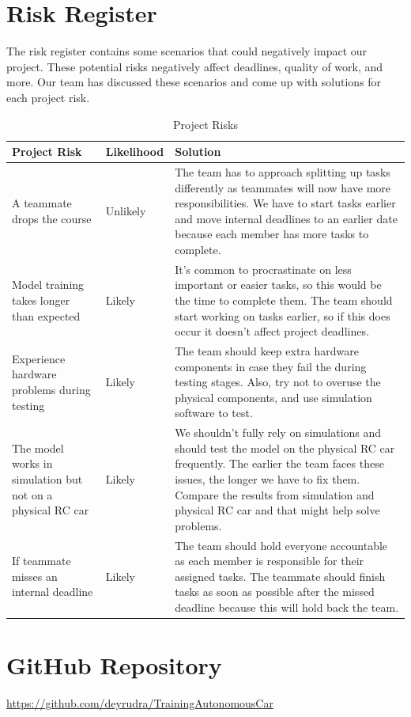 \documentclass{article} %
\begin{document}
\section{Risk Register}
The risk register contains some scenarios that could negatively impact our project. 
These potential risks negatively affect deadlines, quality of work, and more. Our team has 
discussed these scenarios and come up with solutions for each project risk. 

\begin{table}[H]
\caption{Project Risks}
\centering
\begin{tabular}{|p{4cm}|p{2.5cm}|p{7cm}|}
\hline
\textbf{Project Risk} & \textbf{Likelihood} & \textbf{Solution} \\ \hline
A teammate drops the course & Unlikely & The team has to approach splitting up tasks differently as teammates will now have more responsibilities. We have to start tasks earlier and move internal deadlines to an earlier date because each member has more tasks to complete. \\ \hline
Model training takes longer than expected & Likely & It’s common to procrastinate on less important or easier tasks, so this would be the time to complete them. The team should start working on tasks earlier, so if this does occur it doesn’t affect project deadlines. \\ \hline
Experience hardware problems during testing & Likely & The team should keep extra hardware components in case they fail the during testing stages. Also, try not to overuse the physical components, and use simulation software to test. \\ \hline
The model works in simulation but not on a physical RC car & Likely & We shouldn’t fully rely on simulations and should test the model on the physical RC car frequently. The earlier the team faces these issues, the longer we have to fix them. Compare the results from simulation and physical RC car and that might help solve problems. \\ \hline
If teammate misses an internal deadline & Likely & The team should hold everyone accountable as each member is responsible for their assigned tasks. The teammate should finish tasks as soon as possible after the missed deadline because this will hold back the team. \\ \hline
\end{tabular}
\end{table}

\section{GitHub Repository}
\url{https://github.com/deyrudra/TrainingAutonomousCar}
\\\\\\\\\\\\\\\\\\\\\\\\\\\\\\\\

\label{last_page}



\end{document}
